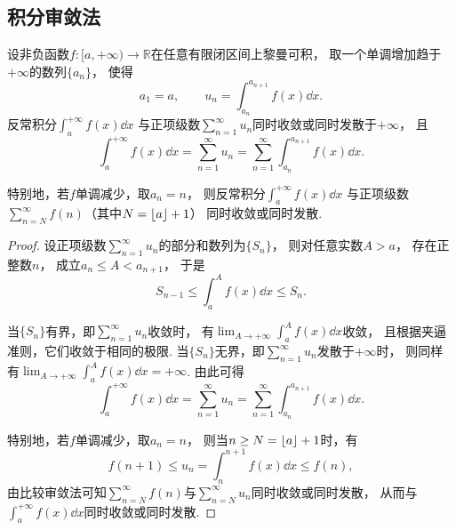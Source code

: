\subsection{积分审敛法}
\begin{theorem}[积分审敛法]\label{theorem:无穷级数.积分审敛法}
设非负函数\(f\colon[a,+\infty)\to\mathbb{R}\)在任意有限闭区间上黎曼可积，
取一个单调增加趋于\(+\infty\)的数列\(\{a_n\}\)，
使得\[
	a_1 = a, \qquad
	u_n = \int_{a_n}^{a_{n+1}} f(x) \dd{x}.
\]
反常积分\(\int_a^{+\infty} f(x) \dd{x}\)
与正项级数\(\sum_{n=1}^\infty u_n\)同时收敛或同时发散于\(+\infty\)，
且\[
	\int_a^{+\infty} f(x) \dd{x}
	= \sum_{n=1}^\infty u_n
	= \sum_{n=1}^\infty \int_{a_n}^{a_{n+1}} f(x) \dd{x}.
\]

特别地，若\(f\)单调减少，取\(a_n = n\)，
则反常积分\(\int_a^{+\infty} f(x) \dd{x}\)
与正项级数\(\sum_{n=N}^\infty f(n)\)（其中\(N=\lfloor a\rfloor+1\)）
同时收敛或同时发散.
\begin{proof}
设正项级数\(\sum_{n=1}^\infty u_n\)的部分和数列为\(\{S_n\}\)，
则对任意实数\(A>a\)，
存在正整数\(n\)，
成立\(a_n \leq A < a_{n+1}\)，
于是\[
	S_{n-1} \leq \int_a^A f(x) \dd{x} \leq S_n.
\]

当\(\{S_n\}\)有界，即\(\sum_{n=1}^\infty u_n\)收敛时，
有\(\lim_{A\to+\infty} \int_a^A f(x) \dd{x}\)收敛，
且根据夹逼准则，它们收敛于相同的极限.
当\(\{S_n\}\)无界，即\(\sum_{n=1}^\infty u_n\)发散于\(+\infty\)时，
则同样有\(\lim_{A\to+\infty} \int_a^A f(x) \dd{x} = +\infty\).
由此可得\[
	\int_a^{+\infty} f(x) \dd{x}
	= \sum_{n=1}^\infty u_n
	= \sum_{n=1}^\infty \int_{a_n}^{a_{n+1}} f(x) \dd{x}.
\]

特别地，若\(f\)单调减少，取\(a_n = n\)，
则当\(n \geq N = \lfloor a\rfloor+1\)时，有\[
	f(n+1) \leq u_n = \int_n^{n+1} f(x) \dd{x} \leq f(n),
\]
由比较审敛法可知\(\sum_{n=N}^\infty f(n)\)与\(\sum_{n=N}^\infty u_n\)同时收敛或同时发散，
从而与\(\int_a^{+\infty} f(x) \dd{x}\)同时收敛或同时发散.
\end{proof}
\end{theorem}

